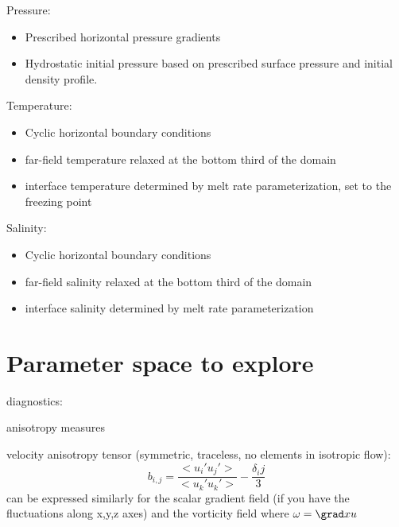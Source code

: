 \documentclass[letterpaper,10pt]{report}
\begin{document}
	Pressure:
	\begin{itemize}
	\item Prescribed horizontal pressure gradients
	\item Hydrostatic initial pressure based on prescribed surface pressure and initial density profile.
	\end{itemize}
	
	Temperature:
	\begin{itemize}
	    \item Cyclic horizontal boundary conditions
	    \item far-field temperature relaxed at the bottom third of the domain
	    \item interface temperature determined by melt rate parameterization, set to the freezing point
	\end{itemize}
	
	Salinity:
    \begin{itemize}
	    \item Cyclic horizontal boundary conditions
	    \item far-field salinity relaxed at the bottom third of the domain
	    \item interface salinity determined by melt rate parameterization
	\end{itemize}
	
	\newpage
	
	\section{Parameter space to explore}
	

diagnostics:

anisotropy measures

velocity anisotropy tensor (symmetric, traceless, no elements in isotropic flow):
\begin{equation}
	b_{i,j} = \frac{<u_i'u_j'>}{<u_k'u_k'>} - \frac{\delta_ij}{3}
\end{equation}
can be expressed similarly for the scalar gradient field (if you have the fluctuations along x,y,z axes)
and the vorticity field where $\omega = \grad x u$
\end{document}
